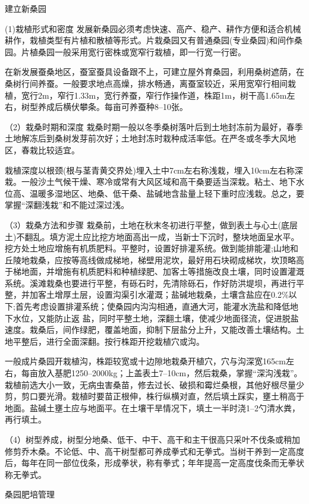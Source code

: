 \documentclass{ctexbook}
\begin{document}
建立新桑园

(1)栽植形式和密度 发展新桑园必须考虑快速、高产、稳产、耕作方便和适合机械耕作，栽植类型有片植和散植等形式。片栽桑园又有普通桑园(专业桑园)和间作桑园。片植桑园一般采用宽行密株或宽窄行栽植，即一行宽一行密。

在新发展蚕桑地区，蚕室蚕具设备跟不上，可建立屋外育桑园，利用桑树遮荫，在桑树行间养蚕。一般要求地点高燥，排水畅通，离蚕室较近，采用宽窄行相间栽植，宽行2m，窄行1.33m，宽行养蚕，窄行作操作道，株距1m，树干高1.65m左右，树型养成后横伏攀条。每亩可养蚕种8--10张。

（2）栽桑时期和深度 栽桑时期一般以冬季桑树落叶后到土地封冻前为最好，春季土地解冻后到桑树发芽前次好；土地封冻时栽种成活率低。在严冬或冬季大风地区，春栽比较适宜。

栽植深度以根颈(根与茎青黄交界处)埋入土中7cm左右称浅栽，埋入10cm左右称深栽。一般沙土气候干燥、寒冷或常有大风区域和高干桑要适当深栽。粘土、地下水位高、温暖多湿地区、地桑、低干桑、盐碱地含盐量上轻下重时应浅栽。总之，要掌握“深翻浅栽”和不能过深过浅。

（3）栽桑方法和步骤 栽桑前，土地在秋末冬初进行平整，做到表土与心土(底层土)不翻乱。填方泥土应比挖方地面高出一成，当新士下沉时，整块地面呈水平。挖方处土地应增施有机质肥料。平整时，设置好排灌系统。做到能排能灌;山地和丘陵地栽桑，应按等高线做成梯地，梯壁用泥坎，最好用石块砌成梯坎，坎顶略高于梯地面，并增施有机质肥料和种植绿肥、加客土等措施改良土壤，同时设置灌溉系统。溪滩栽桑也要进行平整，有砾石时，先清除砾石，作好防洪堤坝，再进行平整，并加客土增厚土层，设置沟渠引水灌溉；盐碱地栽桑，土壤含盐应在0.2\%以下;首先考虑设置排灌系统；使桑园内沟沟相通，直通大河，能灌水洗盐和降低地下水位，又能防止返
盐，同时平整土地，深翻土壤，使减少地面径流，促进脱盐速度。栽桑后，间作绿肥，覆盖地面，抑制下层盐分上升，又能改善土壤结构。土地平整后，进行全面深翻。按行株距开挖栽植穴或沟。

一般成片桑园开栽植沟，株距较宽或十边隙地栽桑开植穴，穴与沟深宽165cm左右，每亩放入基肥1250--2000kg；上盖表土7--10cm，然后栽桑，掌握“深沟浅栽”。
栽植前选大小一致，无病虫害桑苗，修去过长、破损和霉烂桑根，其他好根尽量少剪，剪口要光滑。栽植时要苗正根伸，株行纵横对直，然后填土踩实，壅土稍高于地面。盐碱土壅土应与地面平。在土壤干旱情况下，填土一半时浇1--2勺清水粪，再行填土。

（4）树型养成，树型分地桑、低干、中干、高干和主干很高只采叶不伐条或稍加修剪乔木桑。不论低、中、高干树型都可养成拳式和无拳式。当树干养到一定高度后，每年在同一部位伐条，形成拳状，称有拳式；年年提高一定高度伐条而无拳状称无拳式。

桑园肥培管理
\end{document}
